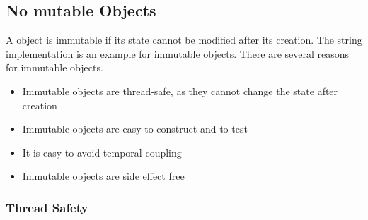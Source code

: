 \subsection{No mutable Objects}\label{subsec:no-mutable-objects}
A object is immutable if its state cannot be modified after its creation.
The string implementation is an example for immutable objects.
There are several reasons for immutable objects.

\begin{itemize}
    \item Immutable objects are thread-safe, as they cannot change the state after creation
    \item Immutable objects are easy to construct and to test
    \item It is easy to avoid temporal coupling
    \item Immutable objects are side effect free
\end{itemize}

\subsubsection{Thread Safety}


